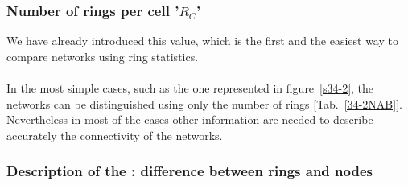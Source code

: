 \subsubsection{Number of rings per cell '$R_C$'}

We have already introduced this value, which is the first and the easiest way to compare networks using ring statistics. \\ 
\nabtqdtab
\\ In the most simple cases, such as the one represented in figure~\ref{s34-2}, the networks can be distinguished using only the number of rings [Tab.~\ref{34-2NAB}]. 
Nevertheless in most of the cases other information are needed to describe accurately the connectivity of the networks.

\subsubsection{Description of the \con: difference between rings and nodes}

